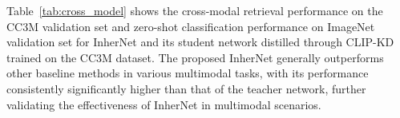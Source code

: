 \documentclass{article} %
\begin{document}


Table~\ref{tab:cross_model} shows the cross-modal retrieval performance on the CC3M validation set and zero-shot classification performance on ImageNet validation set for InherNet and its student network distilled through CLIP-KD trained on the CC3M dataset. The proposed InherNet generally outperforms other baseline methods in various multimodal tasks, with its performance consistently significantly higher than that of the teacher network, further validating the effectiveness of InherNet in multimodal scenarios.










\end{document}
